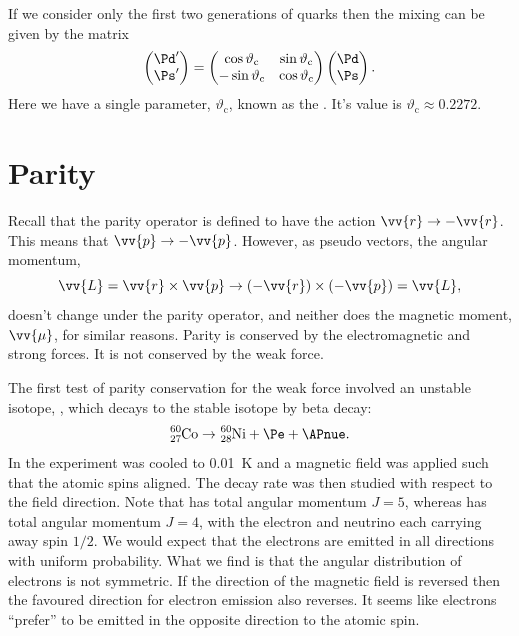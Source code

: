 \documentclass[fleqn]{NotesClass}
\begin{document}
    If we consider only the first two generations of quarks then the mixing can be given by the matrix
    \begin{equation}
        \begin{pmatrix}
            \Pd' \\ \Ps'
        \end{pmatrix}
        =
        \begin{pmatrix}
            \cos\vartheta_{\mathrm{c}} & \sin\vartheta_{\mathrm{c}}\\
            -\sin\vartheta_{\mathrm{c}} & \cos\vartheta_{\mathrm{c}}
        \end{pmatrix}
        \begin{pmatrix}
            \Pd \\ \Ps
        \end{pmatrix}
        .
    \end{equation}
    Here we have a single parameter, \(\vartheta_{\mathrm{c}}\), known as the .
    It's value is \(\vartheta_{\mathrm{c}} \approx 0.2272\).
    
    \section{Parity}
    Recall that the parity operator is defined to have the action \(\vv{r} \to -\vv{r}\).
    This means that \(\vv{p} \to -\vv{p}\).
    However, as pseudo vectors, the angular momentum,
    \begin{equation}
        \vv{L} = \vv{r} \times \vv{p} \to (-\vv{r})\times (-\vv{p}) = \vv{L},
    \end{equation}
    doesn't change under the parity operator, and neither does the magnetic moment, \(\vv{\mu}\), for similar reasons.
    Parity is conserved by the electromagnetic and strong forces.
    It is not conserved by the weak force.
    
    The first test of parity conservation for the weak force involved an unstable isotope, , which decays to the stable isotope  by beta decay:
    \begin{equation}
        \ce{^60_27Co} \to \ce{^60_28Ni} + \Pe + \APnue.
    \end{equation}
    In the experiment  was cooled to \qty{0.01}{\kelvin} and a magnetic field was applied such that the atomic spins aligned.
    The decay rate was then studied with respect to the field direction.
    Note that  has total angular momentum \(J = 5\), whereas  has total angular momentum \(J = 4\), with the electron and neutrino each carrying away spin \(1/2\).
    We would expect that the electrons are emitted in all directions with uniform probability.
    What we find is that the angular distribution of electrons is not symmetric.
    If the direction of the magnetic field is reversed then the favoured direction for electron emission also reverses.
    It seems like electrons \enquote{prefer} to be emitted in the opposite direction to the atomic spin.
    
\end{document}
